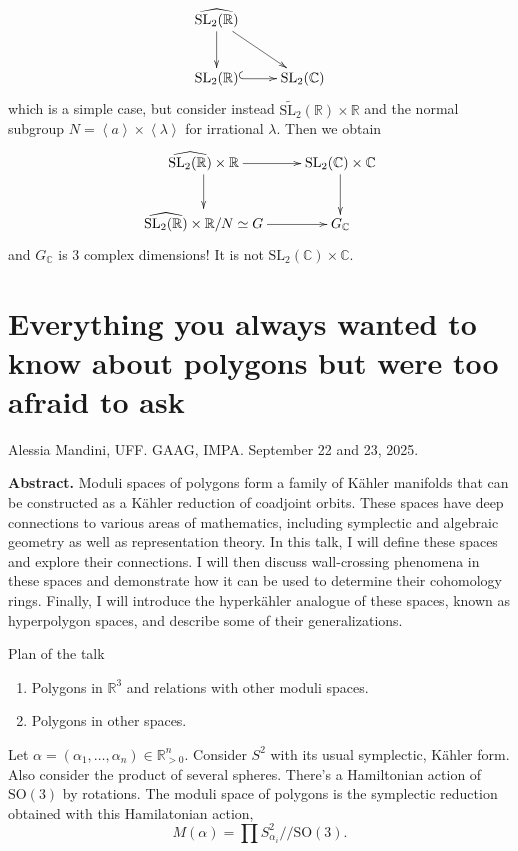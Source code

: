 {\begin{example}
\label{example-complexification-groupoid}
$$
\xymatrix{
\widehat{\text{SL}_2(\mathbb{R})}\ar[d]\ar[dr]\\
\text{SL}_2(\mathbb{R})\ar@{^{(}->}[r]&\text{SL}_2(\mathbb{C})
}
$$
which is a simple case,
but consider instead $\tilde{\text{SL}_2}(\mathbb{R})\times \mathbb{R}$ 
and the normal subgroup $N=\left<a\right>\times \left<\lambda\right>$ 
for irrational $\lambda$. 
Then we obtain
$$
\xymatrix{
\widehat{\text{SL}_2(\mathbb{R})}\times\mathbb{R}\ar[r]\ar[d]
&\text{SL}_2(\mathbb{C})\times\mathbb{C}\ar[d]\\
\widehat{\text{SL}_2(\mathbb{R})}\times\mathbb{R}/N\simeq G\ar[r]&
G_\mathbb{C}
}
$$
and $G_\mathbb{C}$ is 3 complex dimensions! It is not
$\text{SL}_2(\mathbb{C})\times\mathbb{C}$.
\end{example}

\section{Everything you always wanted to know about polygons but were too
afraid to ask}
\label{section-everything-you-awlways-wanted-to-know}

\noindent
Alessia Mandini, UFF.
GAAG, IMPA. 
September 22 and 23, 2025.

\medskip
{\bf Abstract.} Moduli spaces of polygons form a family of Kähler
manifolds that can be constructed as a Kähler reduction of coadjoint orbits.
These spaces have deep connections to various areas of mathematics, including
symplectic and algebraic geometry as well as representation theory. In this
talk, I will define these spaces and explore their connections. I will then
discuss wall-crossing phenomena in these spaces and demonstrate how it can be
used to determine their cohomology rings. Finally, I will introduce the
hyperkähler analogue of these spaces, known as hyperpolygon spaces, and describe
some of their generalizations.

\medskip\noindent



Plan of the talk
\begin{enumerate}
\item Polygons in $\mathbb{R}^3$ and relations with
other moduli spaces.
\item Polygons in other spaces.
\end{enumerate}

Let $\alpha=(\alpha_1,\ldots,\alpha_n)\in \mathbb{R}^n_{>0}$.
Consider $S^2$ with its usual symplectic, Kähler form.
Also consider the product of several spheres.
There's a Hamiltonian action of $\text{SO}(3)$ by rotations.
The moduli space of polygons is
the symplectic reduction obtained with this
Hamilatonian action,
$$
M(\alpha)=\prod S^2_{\alpha_i}/\!/\text{SO}(3).
$$

}
